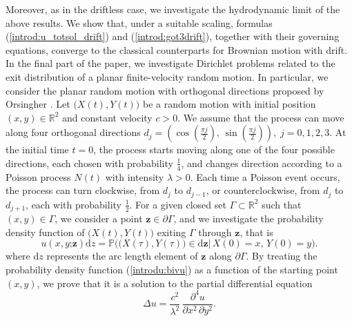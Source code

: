 \documentclass{article}
\begin{document}
Moreover, as in the driftless case, we investigate the hydrodynamic limit of the above results. We show that, under a suitable scaling, formulas (\ref{introd:u_totsol_drift}) and (\ref{introd:got3drift}), together with their governing equations, converge to the classical counterparts for Brownian motion with drift.\\
In the final part of the paper, we investigate Dirichlet problems related to the exit distribution of a planar finite-velocity random motion. In particular, we consider the planar random motion with orthogonal directions proposed by Orsingher \cite{orsingher2000exact}. Let $\big(X(t),Y(t)\big)$ be a random motion with initial position $(x,y)\in\mathbb{R}^2$ and constant velocity $c>0$. We assume that the process can move along four orthogonal directions $d_j=\left(\cos\left(\frac{\pi j}{2}\right),\,\sin\left(\frac{\pi j}{2}\right)\right),\; j=0,1,2,3$. At the initial time $t=0$, the process starts moving along one of the four possible directions, each chosen with probability $\frac{1}{4}$, and changes direction  according to a Poisson process $N(t)$ with intensity $\lambda>0$. Each time a Poisson event occurs, the process can turn clockwise, from $d_j$ to $d_{j-1}$, or counterclockwise, from $d_j$ to $d_{j+1}$, each with probability $\frac{1}{2}$. For a given closed set $\Gamma\subset\mathbb{R}^2$ such that $(x,y)\in\Gamma$, we consider a point $\mathbf{z}\in\partial\Gamma$, and we investigate the probability density function of $\big(X(t),Y(t)\big)$ exiting $\Gamma$ through $\mathbf{z}$, that is 
\begin{equation}\label{introdu:bivu}u(x,y\mathord{;}\mathbf{z})\mathrm{d}z=\mathbb{P}\Big(\big(X(\tau),Y(\tau)\big)\in\mathrm{d}\mathbf{z}\Big\lvert\,X(0)=x,\,Y(0)=y\Big).\end{equation} where $\mathrm{d}z$ represents the arc length element of $\mathbf{z}$ along $\partial \Gamma$. By treating the probability density function (\ref{introdu:bivu}) as a function of the starting point $(x,y)$, we prove that it is a solution to the partial differential equation
\begin{equation}\label{introd:extendedlaplacian}\Delta u =\frac{c^2}{\lambda^2}\,\frac{\partial ^4u}{\partial x^2\,\partial y^2}.\end{equation}
\end{document}
